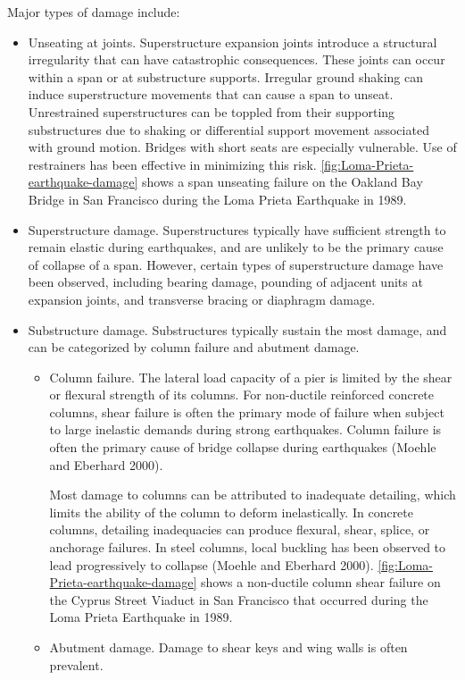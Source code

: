 Major types of damage include:

\begin{itemize}
  \item Unseating at joints. Superstructure expansion joints introduce a structural irregularity that can have
  catastrophic consequences. These joints can occur within a span or at substructure supports. Irregular ground
  shaking can induce superstructure movements that can cause a span to unseat. Unrestrained superstructures
  can be toppled from their supporting substructures due to shaking or differential support movement
  associated with ground motion. Bridges with short seats are especially vulnerable. Use of restrainers has
  been effective in minimizing this risk. \cref{fig:Loma-Prieta-earthquake-damage} shows a span unseating failure on the Oakland Bay Bridge
  in San Francisco during the Loma Prieta Earthquake in 1989.
  \item Superstructure damage. Superstructures typically have sufficient strength to remain elastic during
  earthquakes, and are unlikely to be the primary cause of collapse of a span. However, certain types of
  superstructure damage have been observed, including bearing damage, pounding of adjacent units at
  expansion joints, and transverse bracing or diaphragm damage.
  \item Substructure damage. Substructures typically sustain the most damage, and can be categorized by column
  failure and abutment damage.
  \begin{itemize}
    \item Column failure. The lateral load capacity of a pier is limited by the shear or flexural strength of its
    columns. For non-ductile reinforced concrete columns, shear failure is often the primary mode of failure
    when subject to large inelastic demands during strong earthquakes. Column failure is often the primary
    cause of bridge collapse during earthquakes (Moehle and Eberhard 2000).

    Most damage to columns can be attributed to inadequate detailing, which limits the ability of the column
to deform inelastically. In concrete columns, detailing inadequacies can produce flexural, shear, splice,
or anchorage failures. In steel columns, local buckling has been observed to lead progressively to
collapse (Moehle and Eberhard 2000). \cref{fig:Loma-Prieta-earthquake-damage} shows a non-ductile column shear failure on the Cyprus Street Viaduct in San Francisco that
occurred during the Loma Prieta Earthquake in 1989.
    \item Abutment damage. Damage to shear keys and wing walls is often prevalent.
  \end{itemize}
\end{itemize}

